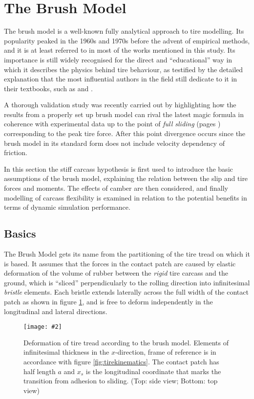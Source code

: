 \documentclass[12pt,a4paper]{report}
\newcommand{\virgolette}[1]{
\textquotedblleft #1\textquotedblright
}
\newcommand{\figura}[5][htbp]{
\begin{figure}[#1]
\begin{center}
\texttt{[image: \#2]}
\caption{#4}\label{#5}
\end{center}
\end{figure}
}
\begin{document}
\section{The Brush Model} \label{sec:brush}
The brush model is a well-known fully analytical approach to tire modelling. Its popularity peaked in the 1960s and 1970s before the advent of empirical methods, and it is at least referred to in most of the works mentioned in this study.
Its importance is still widely recognised for the direct and \virgolette{educational} way in which it describes the physics behind tire behaviour, as testified by the detailed explanation that the most influential authors in the field still dedicate to it in their textbooks, such as \citep{wong01} and \citep{pacejka02}.

A thorough validation study was recently carried out by \citep{sven09} highlighting how the results from a properly set up brush model can rival the latest magic formula in coherence with experimental data up to the point of \emph{full sliding} (pages \pageref{patch:regions}) corresponding to the peak tire force. After this point divergence occurs since the brush model in its standard form does not include velocity dependency of friction.

In this section the stiff carcass hypothesis is first used to introduce the basic assumptions of the brush model, explaining the relation between the slip and tire forces and moments. The effects of camber are then considered, and finally modelling of carcass flexibility is examined in relation to the potential benefits in terms of dynamic simulation performance.

\subsection{Basics}
The Brush Model gets its name from the partitioning of the tire tread on which it is based.
It assumes that the forces in the contact patch are caused by elastic deformation of the volume of rubber between the \emph{rigid} tire carcass and the ground, which is \virgolette{sliced} perpendicularly to the rolling direction into infinitesimal \emph{bristle} elements.
Each bristle extends laterally across the full width of the contact patch as shown in figure \ref{fig:brushbase}, and is free to deform independently in the longitudinal and lateral directions.

\figura{pix/brushbase.jpg}{width=12cm}{Deformation of tire tread according to the brush model. Elements of infinitesimal thickness in the $x$-direction, frame of reference is in accordance with figure \ref{fig:tirekinematics}. The contact patch has half length $a$ and $x_s$ is the longitudinal coordinate that marks the transition from adhesion to sliding. (Top: side view; Bottom: top view)}{fig:brushbase}
\end{document}
